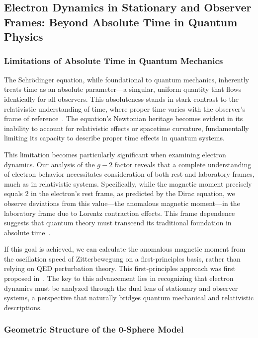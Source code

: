 \documentclass[%
 reprint,
 amsmath,amssymb,
 aps,
]{revtex4-1}
\numberwithin{equation}{section}%
\begin{document}
\subsection{\label{sec:Electron Dynamics in}Electron Dynamics in Stationary and Observer Frames: Beyond Absolute Time in Quantum Physics}

\subsubsection{\label{sec:Limitations of Absolute}Limitations of Absolute Time in Quantum Mechanics}

The Schrödinger equation, while foundational to quantum mechanics, inherently treats time as an absolute parameter—a singular, uniform quantity that flows identically for all observers. This absoluteness stands in stark contrast to the relativistic understanding of time, where proper time varies with the observer's frame of reference~\cite{fock1937}. The equation's Newtonian heritage becomes evident in its inability to account for relativistic effects or spacetime curvature, fundamentally limiting its capacity to describe proper time effects in quantum systems.

This limitation becomes particularly significant when examining electron dynamics. Our analysis of the $g-2$ factor reveals that a complete understanding of electron behavior necessitates consideration of both rest and laboratory frames, much as in relativistic systems. Specifically, while the magnetic moment precisely equals 2 in the electron's rest frame, as predicted by the Dirac equation, we observe deviations from this value—the anomalous magnetic moment—in the laboratory frame due to Lorentz contraction effects. This frame dependence suggests that quantum theory must transcend its traditional foundation in absolute time~\cite{briggs2015, pauli1981}.

If this goal is achieved, we can calculate the anomalous magnetic moment from the oscillation speed of Zitterbewegung on a first-principles basis, rather than relying on QED perturbation theory. This first-principles approach was first proposed in~\cite{hanamura2023}. The key to this advancement lies in recognizing that electron dynamics must be analyzed through the dual lens of stationary and observer systems, a perspective that naturally bridges quantum mechanical and relativistic descriptions.

\subsubsection{\label{sec:Geometric Structure of}Geometric Structure of the 0-Sphere Model}
\end{document}
